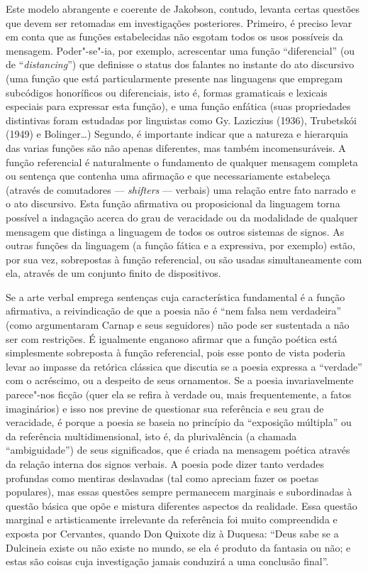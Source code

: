 Este modelo abrangente e coerente de Jakobson, contudo, levanta certas
questões que devem ser retomadas em investigações posteriores. Primeiro,
é preciso levar em conta que as funções estabelecidas não esgotam todos
os usos possíveis da mensagem. Poder"-se"-ia, por exemplo, acrescentar uma
função ``diferencial'' (ou de ``\emph{distancing}'') que definisse o
status dos falantes no instante do ato discursivo (uma função que está
particularmente presente nas linguagens que empregam subcódigos
honoríficos ou diferenciais, isto é, formas gramaticais e lexicais
especiais para expressar esta função), e uma função enfática (suas
propriedades distintivas foram estudadas por linguistas como Gy.
Laziczius (1936), Trubetskói (1949) e Bolinger\ldots{}) Segundo, é importante
indicar que a natureza e hierarquia das varias funções são não apenas
diferentes, mas também incomensuráveis. A função referencial é
naturalmente o fundamento de qualquer mensagem completa ou sentença que
contenha uma afirmação e que necessariamente estabeleça (através de
comutadores --- \emph{shifters} --- verbais) uma relação entre fato
narrado e o ato discursivo. Esta função afirmativa ou proposicional da
linguagem torna possível a indagação acerca do grau de veracidade ou da
modalidade de qualquer mensagem que distinga a linguagem de todos os
outros sistemas de signos. As outras funções da linguagem (a função
fática e a expressiva, por exemplo) estão, por sua vez, sobrepostas à
função referencial, ou são usadas simultaneamente com ela, através de um
conjunto finito de dispositivos.

Se a arte verbal emprega sentenças cuja característica fundamental é a
função afirmativa, a reivindicação de que a poesia não é ``nem falsa nem
verdadeira'' (como argumentaram Carnap e seus seguidores) não pode ser
sustentada a não ser com restrições. É igualmente enganoso afirmar que a
função poética está simplesmente sobreposta à função referencial, pois
esse ponto de vista poderia levar ao impasse da retórica clássica que
discutia se a poesia expressa a ``verdade'' com o acréscimo, ou a
despeito de seus ornamentos. Se a poesia invariavelmente parece"-nos
ficção (quer ela se refira à verdade ou, mais frequentemente, a fatos
imaginários) e isso nos previne de questionar sua referência e seu grau
de veracidade, é porque a poesia se baseia no princípio da ``exposição
múltipla'' ou da referência multidimensional, isto é, da plurivalência
(a chamada ``ambiguidade'') de seus significados, que é criada na
mensagem poética através da relação interna dos signos verbais. A poesia
pode dizer tanto verdades profundas como mentiras deslavadas (tal como
apreciam fazer os poetas populares), mas essas questões sempre
permanecem marginais e subordinadas à questão básica que opõe e mistura
diferentes aspectos da realidade. Essa questão marginal e artisticamente
irrelevante da referência foi muito compreendida e exposta por
Cervantes, quando Don Quixote diz à Duquesa: ``Deus sabe se a Dulcineia
existe ou não existe no mundo, se ela é produto da fantasia ou não; e
estas são coisas cuja investigação jamais conduzirá a uma conclusão
final''.

